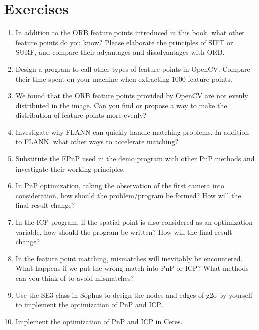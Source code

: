 \section*{Exercises}
\begin{enumerate}
	\item In addition to the ORB feature points introduced in this book, what other feature points do you know? Please elaborate the principles of SIFT or SURF, and compare their advantages and disadvantages with ORB.
	\item Design a program to call other types of feature points in OpenCV. Compare their time spent on your machine when extracting 1000 feature points.
	\item[\optional] We found that the ORB feature points provided by OpenCV are not evenly distributed in the image. Can you find or propose a way to make the distribution of feature points more evenly?
	\item Investigate why FLANN can quickly handle matching problems. In addition to FLANN, what other ways to accelerate matching?
	\item Substitute the EPnP used in the demo program with other PnP methods and investigate their working principles.
	\item In PnP optimization, taking the observation of the first camera into consideration, how should the problem/program be formed? How will the final result change?
	\item In the ICP program, if the spatial point is also considered as an optimization variable, how should the program be written? How will the final result change?
	\item[\optional] In the feature point matching, mismatches will inevitably be encountered. What happens if we put the wrong match into PnP or ICP? What methods can you think of to avoid mismatches?
	\item[\optional] Use the SE3 class in Sophus to design the nodes and edges of g2o by yourself to implement the optimization of PnP and ICP.
	\item[\optional] Implement the optimization of PnP and ICP in Ceres.
\end{enumerate}

